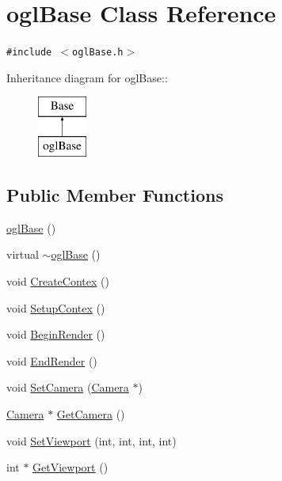 \hypertarget{classogl_base}{
\section{oglBase Class Reference}
\label{classogl_base}
}
{\tt \#include $<$oglBase.h$>$}

Inheritance diagram for oglBase::\begin{figure}[H]
\begin{center}
\leavevmode
\includegraphics[height=2cm]{classogl_base}
\end{center}
\end{figure}
\subsection*{Public Member Functions}
\begin{CompactItemize}
\item 
\hyperlink{classogl_base_b45c72c8aa5cb0071ac177c92acb9eaf}{oglBase} ()
\item 
virtual \hyperlink{classogl_base_878d003e71fb5100c14234067b5127cf}{$\sim$oglBase} ()
\item 
void \hyperlink{classogl_base_fcf2db7348389e95bbd9d6f27450463a}{CreateContex} ()
\item 
void \hyperlink{classogl_base_f3a0c08f71bda7be4c20aef2247e5b52}{SetupContex} ()
\item 
void \hyperlink{classogl_base_a75a22cce4389543fe130f5540dd481b}{BeginRender} ()
\item 
void \hyperlink{classogl_base_b631bdff58ff97debfac8de95af16f79}{EndRender} ()
\item 
void \hyperlink{classogl_base_670c661d28fb47da29f4a7ba2ea39f87}{SetCamera} (\hyperlink{class_camera}{Camera} $\ast$)
\item 
\hyperlink{class_camera}{Camera} $\ast$ \hyperlink{classogl_base_a102dbfe5a17fb2f2954140de4c92895}{GetCamera} ()
\item 
void \hyperlink{classogl_base_ea045b4b3e3db04be98919a4cbec22bc}{SetViewport} (int, int, int, int)
\item 
int $\ast$ \hyperlink{classogl_base_07bd06c4bda42521313f56fcac5b7203}{GetViewport} ()
\end{CompactItemize}


